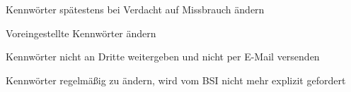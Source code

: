 \item Kennwörter spätestens bei Verdacht auf Missbrauch ändern
\item Voreingestellte Kennwörter ändern
\item Kennwörter nicht an Dritte weitergeben und nicht per E-Mail versenden
\item Kennwörter regelmäßig zu ändern, wird vom BSI nicht mehr explizit gefordert